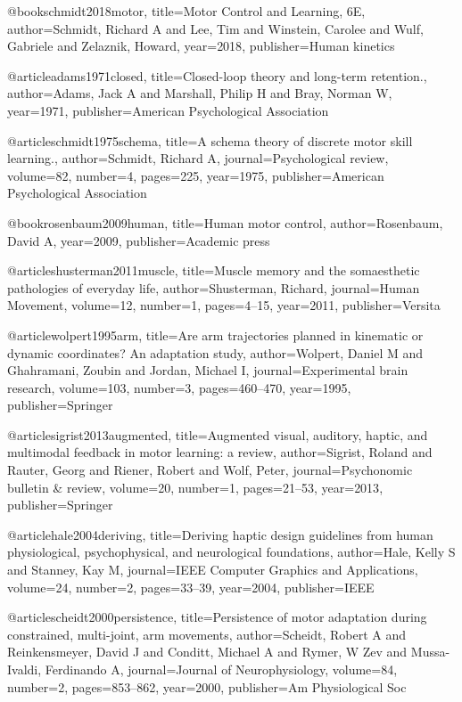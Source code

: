 @book{schmidt2018motor,
  title={Motor Control and Learning, 6E},
  author={Schmidt, Richard A and Lee, Tim and Winstein, Carolee and Wulf, Gabriele and Zelaznik, Howard},
  year={2018},
  publisher={Human kinetics}
}

@article{adams1971closed,
  title={Closed-loop theory and long-term retention.},
  author={Adams, Jack A and Marshall, Philip H and Bray, Norman W},
  year={1971},
  publisher={American Psychological Association}
}

@article{schmidt1975schema,
  title={A schema theory of discrete motor skill learning.},
  author={Schmidt, Richard A},
  journal={Psychological review},
  volume={82},
  number={4},
  pages={225},
  year={1975},
  publisher={American Psychological Association}
}

@book{rosenbaum2009human,
  title={Human motor control},
  author={Rosenbaum, David A},
  year={2009},
  publisher={Academic press}
}

@article{shusterman2011muscle,
  title={Muscle memory and the somaesthetic pathologies of everyday life},
  author={Shusterman, Richard},
  journal={Human Movement},
  volume={12},
  number={1},
  pages={4--15},
  year={2011},
  publisher={Versita}
}

@article{wolpert1995arm,
  title={Are arm trajectories planned in kinematic or dynamic coordinates? An adaptation study},
  author={Wolpert, Daniel M and Ghahramani, Zoubin and Jordan, Michael I},
  journal={Experimental brain research},
  volume={103},
  number={3},
  pages={460--470},
  year={1995},
  publisher={Springer}
}

@article{sigrist2013augmented,
  title={Augmented visual, auditory, haptic, and multimodal feedback in motor learning: a review},
  author={Sigrist, Roland and Rauter, Georg and Riener, Robert and Wolf, Peter},
  journal={Psychonomic bulletin \& review},
  volume={20},
  number={1},
  pages={21--53},
  year={2013},
  publisher={Springer}
}

@article{hale2004deriving,
  title={Deriving haptic design guidelines from human physiological, psychophysical, and neurological foundations},
  author={Hale, Kelly S and Stanney, Kay M},
  journal={IEEE Computer Graphics and Applications},
  volume={24},
  number={2},
  pages={33--39},
  year={2004},
  publisher={IEEE}
}

@article{scheidt2000persistence,
  title={Persistence of motor adaptation during constrained, multi-joint, arm movements},
  author={Scheidt, Robert A and Reinkensmeyer, David J and Conditt, Michael A and Rymer, W Zev and Mussa-Ivaldi, Ferdinando A},
  journal={Journal of Neurophysiology},
  volume={84},
  number={2},
  pages={853--862},
  year={2000},
  publisher={Am Physiological Soc}
}


